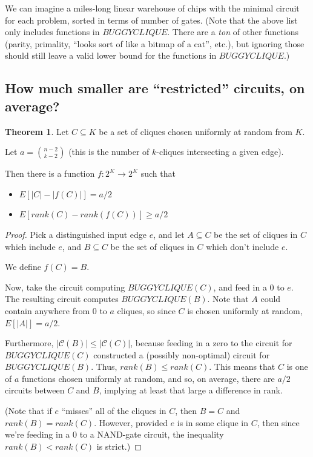 \documentclass[12pt]{article}
\theoremstyle{definition}
\newtheorem{thm}{Theorem}[section]
\newcommand{\bigC}[0]{\mathcal{C}}
\begin{document}
We can imagine a miles-long linear warehouse of chips with the minimal
circuit for each problem, sorted in terms of number of gates.
(Note that the above list only includes functions in $BUGGYCLIQUE$.
There are a {\em ton} of other functions (parity, primality, ``looks
sort of like a bitmap of a cat'', etc.), but ignoring
those should still leave a valid lower bound for the functions in $BUGGYCLIQUE$.)

\subsection{How much smaller are ``restricted'' circuits, on average?}

\begin{thm}
\label{vaguelyUpward}
Let $C \subseteq K$ be a set of cliques chosen uniformly at random
from $K$.

Let $a = {n-2 \choose k-2}$ (this is the number of $k$-cliques
intersecting a given edge).

Then there is a function $f: 2^K \rightarrow 2^K$ such that
\begin{itemize}

\item $E[|C| - |f(C)|] = a/2$

\item $E[rank(C) - rank(f(C))] \ge a/2$

\end{itemize}

\end{thm}
\begin{proof}

Pick a distinguished input edge $e$, and let $A \subseteq C$ be
the set of cliques in $C$ which include $e$, and $B \subseteq C$ be
the set of cliques in $C$ which don't include $e$.

We define $f(C) = B$.

Now, take the circuit computing $BUGGYCLIQUE(C)$, and
feed in a 0 to $e$. The resulting circuit computes
$BUGGYCLIQUE(B)$. Note that $A$ could contain anywhere
from 0 to $a$
cliques, so since $C$ is chosen uniformly at random,
$E[|A|] = a/2$.

Furthermore, $|\bigC(B)| \le |\bigC(C)|$, because feeding in
a zero to the circuit for $BUGGYCLIQUE(C)$ constructed a
(possibly non-optimal) circuit for $BUGGYCLIQUE(B)$.
Thus, $rank(B) \le rank(C)$.
This means that
$C$ is one of $a$ functions chosen uniformly at random,
and so, on average, there are $a/2$ circuits between $C$
and $B$, implying at least that large a difference in rank.

(Note that if $e$ ``misses'' all of the cliques in $C$, then $B = C$
and $rank(B) = rank(C)$. However, provided $e$ is in some clique in $C$,
then since we're feeding in a 0 to a NAND-gate circuit,
the inequality $rank(B) < rank(C)$ is strict.)

\end{proof}
\end{document}
